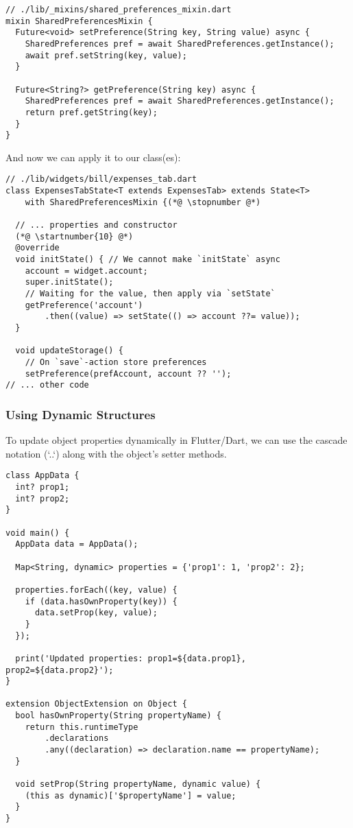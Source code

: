 \begin{lstlisting}
// ./lib/_mixins/shared_preferences_mixin.dart
mixin SharedPreferencesMixin {
  Future<void> setPreference(String key, String value) async {
    SharedPreferences pref = await SharedPreferences.getInstance();
    await pref.setString(key, value);
  }

  Future<String?> getPreference(String key) async {
    SharedPreferences pref = await SharedPreferences.getInstance();
    return pref.getString(key);
  }
}
\end{lstlisting}

\noindent And now we can apply it to our class(es):

\begin{lstlisting}
// ./lib/widgets/bill/expenses_tab.dart
class ExpensesTabState<T extends ExpensesTab> extends State<T>
    with SharedPreferencesMixin {(*@ \stopnumber @*)

  // ... properties and constructor
  (*@ \startnumber{10} @*)
  @override
  void initState() { // We cannot make `initState` async
    account = widget.account;
    super.initState();
    // Waiting for the value, then apply via `setState`
    getPreference('account')
        .then((value) => setState(() => account ??= value));
  }

  void updateStorage() {
    // On `save`-action store preferences
    setPreference(prefAccount, account ?? '');
// ... other code
\end{lstlisting}


\subsubsection{Using Dynamic Structures}

To update object properties dynamically in Flutter/Dart, we can use the cascade notation (`..`) along with the object's 
setter methods.

\begin{lstlisting}
class AppData {
  int? prop1;
  int? prop2;
}

void main() {
  AppData data = AppData();

  Map<String, dynamic> properties = {'prop1': 1, 'prop2': 2};

  properties.forEach((key, value) {
    if (data.hasOwnProperty(key)) {
      data.setProp(key, value);
    }
  });

  print('Updated properties: prop1=${data.prop1}, prop2=${data.prop2}');
}

extension ObjectExtension on Object {
  bool hasOwnProperty(String propertyName) {
    return this.runtimeType
        .declarations
        .any((declaration) => declaration.name == propertyName);
  }

  void setProp(String propertyName, dynamic value) {
    (this as dynamic)['$propertyName'] = value;
  }
}
\end{lstlisting}

